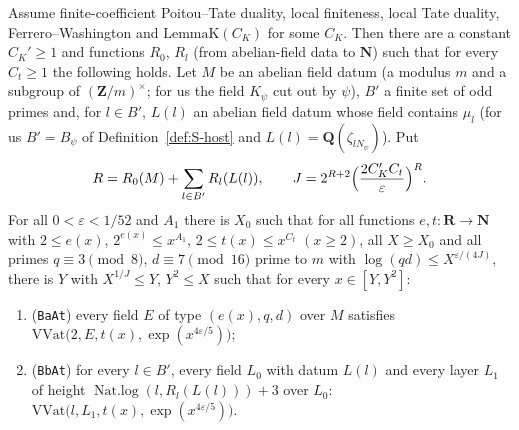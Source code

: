 \begin{proposition}\label{prop:S-bab}
Assume finite-coefficient Poitou--Tate duality, local finiteness, local Tate duality,
Ferrero--Washington and $\mathrm{LemmaK}(C_K)$ for some $C_K$. Then there are a constant $C_K'\ge1$ and functions $R_0$,
$R_l$ (from abelian-field data to $\mathbf{N}$) such that for every $C_t\ge1$ the following holds. Let $M$ be an
abelian field datum (a modulus $m$ and a subgroup of $(\mathbf{Z}/m)^\times$; for us the field $K_\psi$ cut out by $\psi$),
$B'$ a finite set of odd primes and, for $l\in B'$, $L(l)$ an abelian field datum whose field contains $\mu_l$
(for us $B'=B_\psi$ of Definition~\ref{def:S-host} and $L(l)=\mathbf{Q}(\zeta_{lN_\psi})$). Put
\[
  R=R_0(M)+\sum_{l\in B'}R_l(L(l)),\qquad J=2^{R+2}\Bigl(\frac{2C_K'C_t}{\varepsilon}\Bigr)^{R}.
\]
For all $0<\varepsilon<1/52$ and $A_1$ there is $X_0$ such that for all functions $e,t:\mathbf{R}\to\mathbf{N}$ with
$2\le e(x)$, $2^{e(x)}\le x^{A_1}$, $2\le t(x)\le x^{C_t}$ $(x\ge 2)$, all $X\ge X_0$ and all primes
$q\equiv3\pmod 8$, $d\equiv 7\pmod{16}$ prime to $m$ with $\log(qd)\le X^{\varepsilon/(4J)}$, there is $Y$ with
$X^{1/J}\le Y$, $Y^2\le X$ such that for every $x\in[Y,Y^2]$:
\begin{enumerate}
\item[\textup{(a)}] (\texttt{BaAt}) every field $E$ of type $(e(x),q,d)$ over $M$ satisfies
      $\mathrm{VVat}\bigl(2,E,t(x),\exp(x^{4\varepsilon/5})\bigr)$;
\item[\textup{(b)}] (\texttt{BbAt}) for every $l\in B'$, every field $L_0$ with datum $L(l)$ and every layer $L_1$
      of height $\operatorname{Nat.log}(l,R_l(L(l)))+3$ over $L_0$: $\mathrm{VVat}\bigl(l,L_1,t(x),\exp(x^{4\varepsilon/5})\bigr)$.
\end{enumerate}
\end{proposition}
